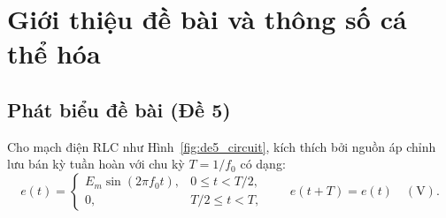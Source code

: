 \section{Giới thiệu đề bài và thông số cá thể hóa}

\subsection{Phát biểu đề bài (Đề 5)}
Cho mạch điện RLC như Hình~\ref{fig:de5_circuit}, kích thích bởi nguồn áp chỉnh lưu bán kỳ tuần hoàn với chu kỳ $T = 1/f_0$ có dạng:
\begin{equation}
    e(t) =
    \begin{cases}
        E_m \sin(2\pi f_0 t), & 0 \le t < T/2, \\
        0,                    & T/2 \le t < T,
    \end{cases}
    \qquad e(t + T) = e(t) \quad (\text{V}).
    \label{eq:source_def}
\end{equation}

